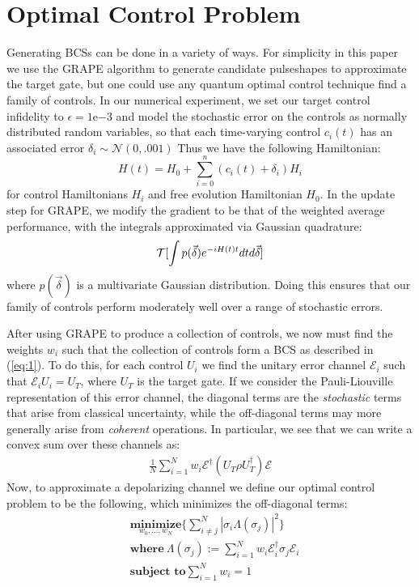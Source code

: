 \documentclass[aps,nofootinbib,pra,notitlepage,twocolumn]{revtex4-1}
\begin{document}
\section{Optimal Control Problem}
Generating BCSs can be done in a variety of ways. For simplicity in this paper we use the GRAPE algorithm to generate candidate pulseshapes to approximate the target gate, but one could use any quantum optimal control technique find a family of controls. In our numerical experiment, we set our target control infidelity to $\epsilon=1\mathrm{e}{-3}$ and model the stochastic error on the controls as normally distributed random variables, so that each time-varying control $c_i(t)$ has an associated error $\delta_i \mathtt{\sim} \mathcal{N}(0, .001)$
Thus we have the following Hamiltonian:
\begin{equation}\label{eq:2}
  H(t) = H_0 + \sum_{i=0}^n (c_i(t) + \delta_i)H_i
\end{equation}
for control Hamiltonians $H_i$ and free evolution Hamiltonian $H_0$. In the update step for GRAPE, we modify the gradient to be that of the weighted average performance, with the integrals approximated via Gaussian quadrature:
\begin{equation}
   \mathcal{T}[\int p(\vec{\delta})e^{-iH(t)t}dtd\vec{\delta}]\\
\end{equation}
where $p(\vec{\delta})$ is a multivariate Gaussian distribution.
Doing this ensures that our family of controls perform moderately well over a range of stochastic errors.

After using GRAPE to produce a collection of controls, we now must find the weights $w_i$ such that the collection of controls form a BCS as described in (\ref{eq:1}). To do this, for each control $U_i$ we find the unitary error channel $\mathcal{E}_i$ such that $\mathcal{E}_iU_i=U_T$, where $U_T$ is the target gate. If we consider the Pauli-Liouville representation of this error channel, the diagonal terms are the \textit{stochastic} terms that arise from classical uncertainty, while the off-diagonal terms may more generally arise from \textit{coherent} operations. In particular, we see that we can write a convex sum over these channels as:
\begin{align}
 \frac{1}{N} \sum^N_{i=1} w_i \mathcal{E}^{\dagger} (U_T\rho U_T^{\dagger}) \mathcal{E}
\end{align}
Now, to approximate a depolarizing channel we define our optimal control problem to be the following, which minimizes the off-diagonal terms:
\begin{align}
   &\underset{w_0, ..., w_N}{\textbf{minimize}} \{\sum_{i\neq j}^N|\sigma_i\Lambda(\sigma_j)|^2\}\\
   &\textbf{where}\ \Lambda(\sigma_j) := \sum^N_{i=1}w_i\mathcal{E}_i^{\dagger}\sigma_j\mathcal{E}_i\\
   &\textbf{subject to} \sum_{i=1}^Nw_i = 1
\end{align}
\end{document}
